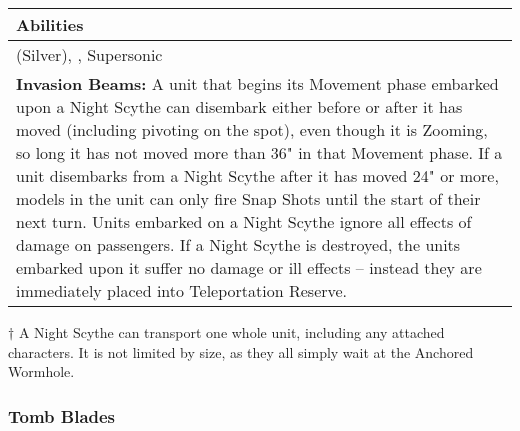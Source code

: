 \noindent
\begin{tabular}{||m{532pt}||}
	\hline
	Abilities \\
	\hline
	\quickref{Awakening Protocols} (Silver), \quickref{Living Metal}, Supersonic\\
	\textbf{Invasion Beams:} A unit that begins its Movement phase embarked upon a Night Scythe can disembark either before or after it has moved (including pivoting on the spot), even though it is Zooming, so long it has not moved more than 36" in that Movement phase. If a unit disembarks from a Night Scythe after it has moved 24" or more, models in the unit can only fire Snap Shots until the start of their next turn. Units
	embarked on a Night Scythe ignore all effects of damage on passengers. If a Night Scythe is destroyed, the units embarked upon it suffer no damage or ill effects – instead they are immediately placed into Teleportation Reserve. \\
	\hline
\end{tabular}
\begin{tablenotes}
\item{ $\dagger$ A Night Scythe can transport one whole unit, including any attached characters. It is not limited by size, as they all simply wait at the Anchored Wormhole.}
\end{tablenotes}


\newpage
\subsubsection{Tomb Blades}

